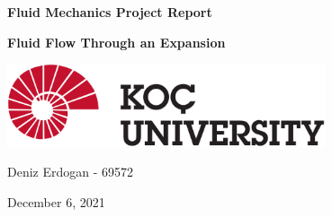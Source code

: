 \begin{titlepage}
	\begin{center}
		\vspace*{1cm}
        \hline
        \vspace{0.4cm}
		\textbf{\Huge Fluid Mechanics Project Report}
		\vspace{0.4cm}
		\hline

		\vspace{2cm}
		\textbf{\huge{Fluid Flow Through an Expansion }}

		\vspace{5cm}
		
		
        \includegraphics[width=0.7\textwidth]{images/task1/Koc_Logo.png}
        
        
        \vfill
        
		\Large{Deniz Erdogan - 69572}

		December 6, 2021

		\vspace{0.8cm}


	\end{center}
\end{titlepage}